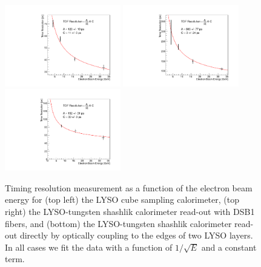 \begin{figure}[H] \centering
\includegraphics[width=0.45\textwidth]{figs/timing/TimeResolutionVsEnergy_CrystalCube} 
\includegraphics[width=0.45\textwidth]{figs/timing/TimeResolutionVsEnergy_ShashlikDSB1Fiber} \\
\includegraphics[width=0.45\textwidth]{figs/timing/TimeResolutionVsEnergy_ShashlikSideReadout} 
\caption{ Timing resolution measurement as a function of the electron
  beam energy for (top left) the LYSO cube
sampling calorimeter, 
(top right) the LYSO-tungsten shashlik
calorimeter read-out with DSB1 fibers, and %
(bottom) the LYSO-tungsten shashlik calorimeter read-out directly by optically coupling to the edges of two LYSO layers. 
In all cases we fit the data with a function of $1/\sqrt{E}$  and a constant term. }
\label{fig:ShashlikSideReadoutTOFResolutionVsEnergy}
\end{figure}


